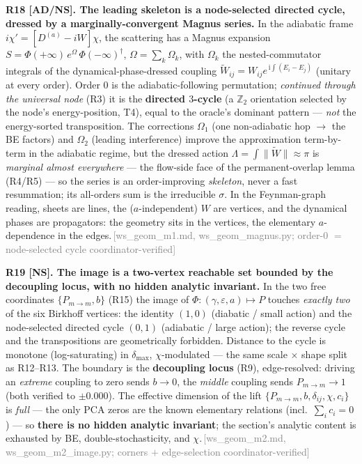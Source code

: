 \documentclass[aps,prd,reprint,nofootinbib]{revtex4-2}
\newcommand{\pnote}[1]{\textcolor{gray}{\footnotesize\,[#1]}}
\newcommand{\eps}{\varepsilon}
\newcommand{\Pmid}{P_{m\to m}}   %
\begin{document}
\textbf{R18 [AD/NS]. The leading skeleton is a node-selected directed cycle, dressed by a
marginally-convergent Magnus series.} In the adiabatic frame $i\chi'=[D^{(a)}-iW]\chi$, the scattering has a
Magnus expansion $S=\Phi(+\infty)\,e^{\Omega}\,\Phi(-\infty)^\dagger$, $\Omega=\sum_k\Omega_k$, with
$\Omega_k$ the nested-commutator integrals of the dynamical-phase-dressed coupling
$\widetilde W_{ij}=W_{ij}e^{\,\mathrm{i}\!\int(E_i-E_j)}$ (unitary at every order). Order $0$ is the
adiabatic-following permutation; \emph{continued through the universal node} (R3) it is the \textbf{directed
$3$-cycle} (a $\mathbb Z_2$ orientation selected by the node's energy-position, T4), equal to the oracle's
dominant pattern --- \emph{not} the energy-sorted transposition. The corrections $\Omega_1$ (one non-adiabatic hop $\to$ the BE factors)
and $\Omega_2$ (leading interference) improve the approximation term-by-term in the adiabatic regime, but
the dressed action $\Lambda=\int\|\widetilde W\|\approx\pi$ is \emph{marginal almost everywhere} --- the
flow-side face of the permanent-overlap lemma (R4/R5) --- so the series is an order-improving
\emph{skeleton}, never a fast resummation; its all-orders sum is the irreducible $\sigma$. In the
Feynman-graph reading, sheets are lines, the ($a$-independent) $W$ are vertices, and the dynamical phases
are propagators: the geometry sits in the vertices, the elementary $a$-dependence in the
edges.\pnote{ws\_geom\_m1.md, ws\_geom\_magnus.py; order-0 $=$ node-selected cycle coordinator-verified}

\textbf{R19 [NS]. The image is a two-vertex reachable set bounded by the decoupling locus, with no hidden
analytic invariant.} In the two free coordinates $\{\Pmid,b\}$ (R15) the image of
$\Phi:(\gamma,\eps,a)\mapsto P$ touches \emph{exactly two} of the six Birkhoff vertices: the identity
$(1,0)$ (diabatic / small action) and the node-selected directed cycle $(0,1)$ (adiabatic / large action);
the reverse cycle and the transpositions are geometrically forbidden. Distance to the cycle is monotone
(log-saturating) in $\delta_{\max}$, $\chi$-modulated --- the same scale$\,\times\,$shape split as
R12--R13. The boundary is the \textbf{decoupling locus} (R9), edge-resolved: driving an \emph{extreme}
coupling to zero sends $b\to0$, the \emph{middle} coupling sends $\Pmid\to1$ (both verified to $\pm0.000$).
The effective dimension of the lift $\{\Pmid,b,\delta_{ij},\chi,c_i\}$ is \emph{full} --- the only PCA
zeros are the known elementary relations (incl.\ $\sum_i c_i=0$) --- so \textbf{there is no hidden analytic
invariant}; the section's analytic content is exhausted by BE, double-stochasticity, and
$\chi$.\pnote{ws\_geom\_m2.md, ws\_geom\_m2\_image.py; corners $+$ edge-selection coordinator-verified}
\end{document}
